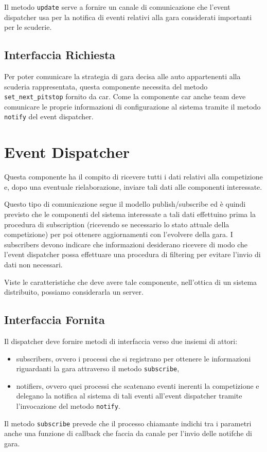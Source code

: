 \documentclass[11pt,a4paper]{report}
\newcommand{\fun}[1]{\texttt{#1}}
\begin{document}
Il metodo \fun{update} serve a fornire un canale di comunicazione che l'event dispatcher usa per la notifica di eventi relativi alla gara considerati importanti per le scuderie.
\subsection*{Interfaccia Richiesta}
Per poter comunicare la strategia di gara decisa alle auto appartenenti alla scuderia rappresentata, questa componente necessita del metodo \fun{set\_next\_pitstop} fornito da car.
Come la componente car anche team deve comunicare le proprie informazioni di configurazione al sistema tramite il metodo \fun{notify} del event dispatcher.
\section{Event Dispatcher}
Questa componente ha il compito di ricevere tutti i dati relativi alla competizione e, dopo una eventuale rielaborazione, inviare tali dati alle componenti interessate.

Questo tipo di comunicazione segue il modello publish/subscribe ed è quindi previsto che le componenti del sistema interessate a tali dati effettuino prima la procedura di subscription (ricevendo se necessario lo stato attuale della competizione) per poi ottenere aggiornamenti con l'evolvere della gara. I subscribers devono indicare che informazioni desiderano ricevere di modo che l'event dispatcher possa effettuare una procedura di filtering per evitare l'invio di dati non necessari.

Viste le caratteristiche che deve avere tale componente, nell'ottica di un sistema distribuito, possiamo considerarla un server.
\subsection*{Interfaccia Fornita}
Il dispatcher deve fornire metodi di interfaccia verso due insiemi di attori:
\begin{itemize}
\item subscribers, ovvero i processi che si registrano per ottenere le informazioni riguardanti la gara attraverso il metodo \fun{subscribe},
\item notifiers, ovvero quei processi che scatenano eventi inerenti la competizione e delegano la notifica al sistema di tali eventi all'event dispatcher tramite l'invocazione del metodo \fun{notify}.
\end{itemize}
Il metodo \fun{subscribe} prevede che il processo chiamante indichi tra i parametri anche una funzione di callback che faccia da canale per l'invio delle notifche di gara.
\end{document}
